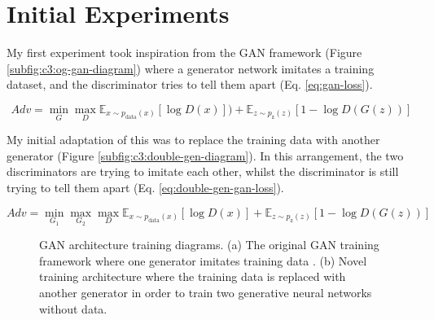 \section{Initial Experiments}

My first experiment took inspiration from the GAN framework (Figure \ref{subfig:c3:og-gan-diagram}) where a generator network imitates a training dataset, and the discriminator tries to tell them apart (Eq. \ref{eq:gan-loss}). 

\begin{equation} 
    Adv =\min_{G}\max_{D}\mathbb{E}_{x\sim p_{\text{data}}(x)}[\log{D(x)}])+  \mathbb{E}_{z\sim p_{\text{z}}(z)}[1 - \log{D(G(z))}]
    \label{eq:gan-loss}
\end{equation}

My initial adaptation of this was to replace the training data with another generator (Figure \ref{subfig:c3:double-gen-diagram}). 
In this arrangement, the two discriminators are trying to imitate each other, whilst the discriminator is still trying to tell them apart (Eq. \ref{eq:double-gen-gan-loss}).

\begin{equation} 
    Adv = \min_{G_{1}}\max_{G_2}\max_{D}\mathbb{E}_{x\sim p_{\text{data}}(x)}[\log{D(x)}] +  \mathbb{E}_{z\sim p_{\text{z}}(z)}[1 - \log{D(G(z))}]
    \label{eq:double-gen-gan-loss}
\end{equation}

\begin{figure}[!htbp]
    \centering
    \hfill
    \caption[GAN architecture training diagrams]{GAN architecture training diagrams. (a) The original GAN training framework where one generator imitates training data \citep{goodfellow2014generative}. (b) Novel training architecture where the training data is replaced with another generator in order to train two generative neural networks without data.}
    \label{fig:c3:gan-diagrams}
  \end{figure}


